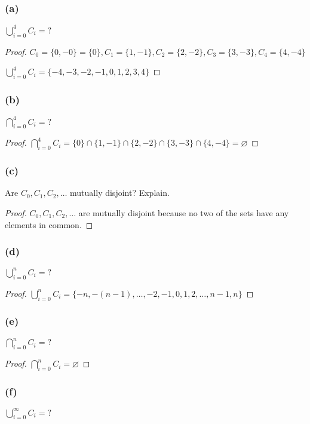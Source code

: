 \documentclass[14pt]{extarticle}
\newcommand{\es}{\varnothing}
\newcommand{\dps}{\displaystyle}
\begin{document}
\subsubsection{(a)}
\(\dps \bigcup_{i=0}^{4}C_i = ?\)

\begin{proof}
  \(C_0 = \{0, -0\} = \{0\}, C_1 = \{1, -1\}, C_2 = \{2, -2\}, C_3 = \{3, -3\}, C_4 = \{4, -4\}\)

  \(\dps \bigcup_{i=0}^{4}C_i = \{-4, -3, -2, -1, 0, 1, 2, 3, 4\}\)
\end{proof}

\subsubsection{(b)}
\(\dps \bigcap_{i=0}^{4}C_i = ?\)

\begin{proof}
  \(\dps \bigcap_{i=0}^{4}C_i = \{0\} \cap \{1, -1\} \cap \{2, -2\} \cap \{3, -3\} \cap \{4, -4\} = \es\)
\end{proof}

\subsubsection{(c)}
Are \(C_0, C_1, C_2, \ldots\) mutually disjoint? Explain.

\begin{proof}
  $C_0, C_1, C_2, \ldots$ are mutually disjoint because no two of the sets have any elements in common.
\end{proof}

\subsubsection{(d)}
\(\dps \bigcup_{i=0}^{n}C_i = ?\)

\begin{proof}
  \(\dps \bigcup_{i=0}^{n}C_i = \{-n, -(n-1), \ldots, -2, -1, 0, 1, 2, \ldots, n-1, n\}\)
\end{proof}

\subsubsection{(e)}
\(\dps \bigcap_{i=0}^{n}C_i = ?\)

\begin{proof}
  \(\dps \bigcap_{i=0}^{n}C_i = \es\)
\end{proof}

\subsubsection{(f)}
\(\dps \bigcup_{i=0}^{\infty}C_i = ?\)
\end{document}
